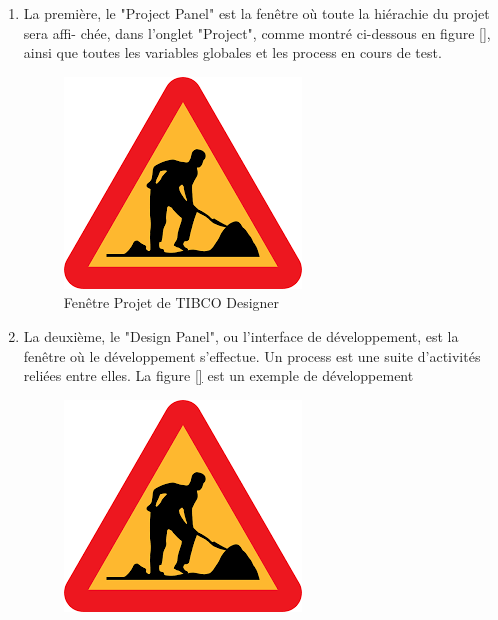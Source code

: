 \begin{enumerate}
	\item La première, le "Project Panel" est la fenêtre où toute la hiérachie du projet sera affi-
	chée, dans l'onglet "Project", comme montré ci-dessous en figure \ref{}, ainsi que toutes les
	variables globales et les process en cours de test.\\
	\begin{figure}[h!]
		\centering
		\includegraphics[width=0.7\linewidth]{img/encours}
		\caption{Fenêtre Projet de TIBCO Designer}
		\label{fig:encours2}
	\end{figure}
	\item La deuxième, le "Design Panel", ou l'interface de développement, est la fenêtre où le
	développement s'effectue. Un process est une suite d'activités reliées entre elles. La figure
	\ref{} est un exemple de développement\\
	\begin{figure}[h!]
		\centering
		\includegraphics[width=0.7\linewidth]{img/encours}

\end{figure}
\end{enumerate}
